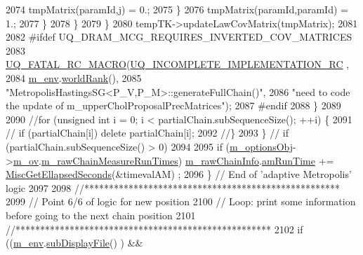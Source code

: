 \begin{DoxyCode}
{{2074                   tmpMatrix(paramId,j) = 0.;
2075                 \}
2076                 tmpMatrix(paramId,paramId) = 1.;
2077               \}
2078             \}
2079           \}
2080           tempTK->updateLawCovMatrix(tmpMatrix);
2081 
2082 \textcolor{preprocessor}{#ifdef UQ\_DRAM\_MCG\_REQUIRES\_INVERTED\_COV\_MATRICES}
2083 \textcolor{preprocessor}{}          \hyperlink{_defines_8h_aa9107e1a9a5197371a412db3fa349988}{UQ\_FATAL\_RC\_MACRO}(\hyperlink{namespace_q_u_e_s_o_a5332d3ac9b246e40779ba01f19a3f0c7}{UQ\_INCOMPLETE\_IMPLEMENTATION\_RC}
      ,
2084                             \hyperlink{class_q_u_e_s_o_1_1_metropolis_hastings_s_g_ac8ea061e55b920e0c8f9bce5c3f20e52}{m\_env}.\hyperlink{class_q_u_e_s_o_1_1_base_environment_a78b57112bbd0e6dd0e8afec00b40ffa7}{worldRank}(),
2085                             \textcolor{stringliteral}{"MetropolisHastingsSG<P\_V,P\_M>::generateFullChain()"},
2086                             \textcolor{stringliteral}{"need to code the update of m\_upperCholProposalPrecMatrices"});
2087 \textcolor{preprocessor}{#endif}
2088 \textcolor{preprocessor}{}        \}
2089 
2090         \textcolor{comment}{//for (unsigned int i = 0; i < partialChain.subSequenceSize(); ++i) \{}
2091         \textcolor{comment}{//  if (partialChain[i]) delete partialChain[i];}
2092         \textcolor{comment}{//\}}
2093       \} \textcolor{comment}{// if (partialChain.subSequenceSize() > 0)}
2094 
2095       \textcolor{keywordflow}{if} (\hyperlink{class_q_u_e_s_o_1_1_metropolis_hastings_s_g_a5d0bc9f73d50d272aa6bfb5ef5939ef3}{m\_optionsObj}->\hyperlink{class_q_u_e_s_o_1_1_metropolis_hastings_s_g_options_a9d4792d9fc2dc5439b8ab489b0c236eb}{m\_ov}.\hyperlink{class_q_u_e_s_o_1_1_mh_options_values_a6fcc2efc9146b68548e62d707aeed883}{m\_rawChainMeasureRunTimes}) 
      \hyperlink{class_q_u_e_s_o_1_1_metropolis_hastings_s_g_ac531509489028853bb17c0353fc9eafd}{m\_rawChainInfo}.\hyperlink{struct_q_u_e_s_o_1_1_m_h_raw_chain_info_struct_a0ea7cbad553a5f79c1e1c89b25bc8cde}{amRunTime} += \hyperlink{namespace_q_u_e_s_o_a424bc33f2e6e287fd468408d14b772ee}{MiscGetEllapsedSeconds}(&timevalAM)
      ;
2096     \} \textcolor{comment}{// End of 'adaptive Metropolis' logic}
2097 
2098     \textcolor{comment}{//****************************************************}
2099     \textcolor{comment}{// Point 6/6 of logic for new position}
2100     \textcolor{comment}{// Loop: print some information before going to the next chain position}
2101     \textcolor{comment}{//****************************************************}
2102     \textcolor{keywordflow}{if} ((\hyperlink{class_q_u_e_s_o_1_1_metropolis_hastings_s_g_ac8ea061e55b920e0c8f9bce5c3f20e52}{m\_env}.\hyperlink{class_q_u_e_s_o_1_1_base_environment_a8a0064746ae8dddfece4229b9ad374d6}{subDisplayFile}()                   ) &&
}}
\end{DoxyCode}
